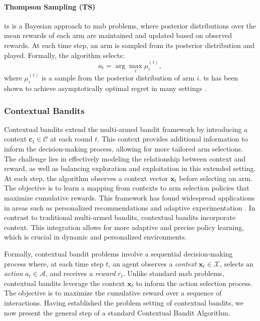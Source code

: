\paragraph{Thompson Sampling (TS)}
\acf{ts} is a Bayesian approach to \ac{mab} problems, where posterior distributions over the mean rewards of each arm are maintained and updated based on observed rewards. At each time step, an arm is sampled from its posterior distribution and played. Formally, the algorithm selects:
\begin{equation}
    a_t = \arg \max_i \mu_i^{(t)},
\end{equation}
where $\mu_i^{(t)}$ is a sample from the posterior distribution of arm $i$. \ac{ts} has been shown to achieve asymptotically optimal regret in many settings \citep{agrawal2012analysis}.

\subsubsection{Contextual Bandits}
Contextual bandits extend the multi-armed bandit framework by introducing a context $\mathbf{c}_t \in \mathcal{C}$ at each round $t$. This context provides additional information to inform the decision-making process, allowing for more tailored arm selections. The challenge lies in effectively modeling the relationship between context and reward, as well as balancing exploration and exploitation in this extended setting. At each step, the algorithm observes a context vector $\mathbf{x}_t$ before selecting an arm. The objective is to learn a mapping from contexts to arm selection policies that maximize cumulative rewards. This framework has found widespread applications in areas such as personalized recommendations and adaptive experimentation \citep{li2010contextual}. In contrast to traditional multi-armed bandits, contextual bandits incorporate context. This integration allows for more adaptive and precise policy learning, which is crucial in dynamic and personalized environments.
 
Formally, contextual bandit problems involve a sequential decision-making process where, at each time step $t$, an agent observes a \textit{context} $\mathbf{x}_t \in \mathcal{X}$, selects an \textit{action} $a_t \in \mathcal{A}$, and receives a \textit{reward} $r_t$. Unlike standard \ac{mab} problems, contextual bandits leverage the context $\mathbf{x}_t$ to inform the action selection process.  The objective is to maximize the cumulative reward over a sequence of interactions.  Having established the problem setting of contextual bandits, we now present the general step of a standard Contextual Bandit Algorithm.

